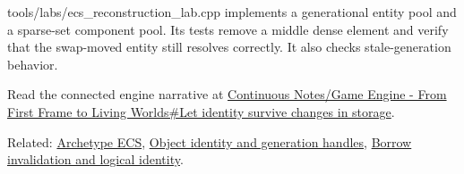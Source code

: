 tools/labs/ecs\_reconstruction\_lab.cpp implements a generational entity pool and a sparse-set component pool. Its tests remove a middle dense element and verify that the swap-moved entity still resolves correctly. It also checks stale-generation behavior.

Read the connected engine narrative at \href{Continuous\%20Notes/Game\%20Engine\%20-\%20From\%20First\%20Frame\%20to\%20Living\%20Worlds\#Let\%20identity\%20survive\%20changes\%20in\%20storage}{Continuous Notes/Game Engine - From First Frame to Living Worlds\#Let identity survive changes in storage}.

Related: \hyperref[appendix-fbfeb0430008]{Archetype ECS}, \hyperref[appendix-f1581457d322]{Object identity and generation handles}, \hyperref[appendix-f9b8b9188c7f]{Borrow invalidation and logical identity}.
